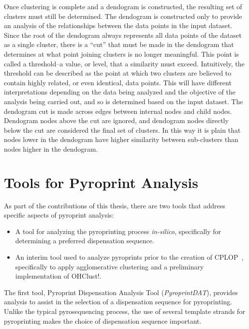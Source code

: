 \documentclass[12pt]{ucthesis}
\begin{document}
         Once clustering is complete and a dendogram is constructed, the
         resulting set of clusters must still be determined. The dendogram is
         constructed only to provide an analysis of the relationships between
         the data points in the input dataset. Since the root of the dendogram
         always represents all data points of the dataset as a single cluster,
         there is a ``cut'' that must be made in the dendogram that determines
         at what point joining clusters is no longer meaningful. This point is
         called a threshold--a value, or level, that a similarity must exceed.
         Intuitively, the threshold can be described as the point at which two
         clusters are believed to contain highly related, or even identical,
         data points. This will have different interpretations depending on the
         data being analyzed and the objective of the analysis being carried
         out, and so is determined based on the input dataset. The dendogram
         cut is made across edges between internal nodes and child nodes.
         Dendogram nodes above the cut are ignored, and dendogram nodes
         directly below the cut are considered the final set of clusters. In
         this way it is plain that nodes lower in the dendogram have higher
         similarity between sub-clusters than nodes higher in the dendogram.

\chapter{Tools for Pyroprint Analysis}\label{chap:other_contributions}
   As part of the contributions of this thesis, there are two tools that
   address specific aspects of pyroprint analysis:
   \begin{itemize}
      \item A tool for analyzing the pyroprinting process \textit{in-silico},
            specifically for determining a preferred dispensation sequence.
      \item An interim tool used to analyze pyroprints prior to the creation of
            CPLOP~\cite{Jan:Thesis}, specifically to apply
            \textsf{agglomerative clustering} and a preliminary implementation
            of OHClust!.
   \end{itemize}
   The first tool, Pyroprint Dispensation Analysis Tool
   (\textit{PyroprintDAT}), provides analysis to assist in the selection of a
   dispensation sequence for pyroprinting. Unlike the typical pyrosequencing
   process, the use of several template strands for pyroprinting makes the
   choice of dispensation sequence important.
\end{document}
